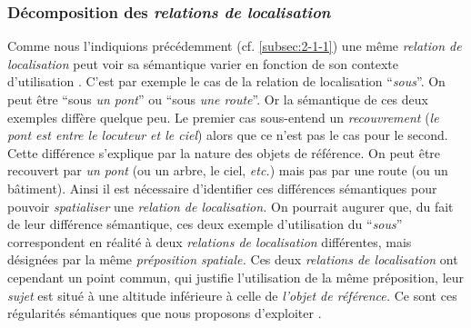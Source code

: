 \subsubsection{Décomposition des \emph{relations de localisation}}

Comme nous l'indiquions précédemment (cf. \ref{subsec:2-1-1}) une même
\emph{relation de localisation} peut voir sa sémantique varier en
fonction de son contexte d'utilisation \autocite[16]{Borillo1998}.
C'est par exemple le cas de la relation de localisation
\enquote{\emph{sous}}. On peut être \enquote{sous \emph{un pont}} ou
\enquote{sous \emph{une route}}. Or la sémantique de ces deux exemples
diffère quelque peu. Le premier cas sous-entend un \emph{recouvrement}
(\ie \emph{le pont est entre le locuteur et le ciel}) alors que ce
n'est pas le cas pour le second. Cette différence s'explique par la
nature des objets de référence. On peut être recouvert par \emph{un
  pont} (ou un arbre, le ciel, \emph{etc.})  mais pas par une route
(ou un bâtiment). Ainsi il est nécessaire d'identifier ces différences
sémantiques pour pouvoir \emph{spatialiser} une \emph{relation de
  localisation.}
%
On pourrait augurer que, du fait de leur différence sémantique, ces
deux exemple d'utilisation du \enquote{\emph{sous}} correspondent en
réalité à deux \emph{relations de localisation} différentes, mais
désignées par la même \emph{préposition spatiale.}
%
Ces deux \emph{relations de localisation} ont cependant un point
commun, qui justifie l'utilisation de la même préposition, leur
\emph{sujet} est situé à une altitude inférieure à celle de
\emph{l'objet de référence.} Ce sont ces régularités sémantiques que
nous proposons d'exploiter \autocite{Bunel2019a}.

